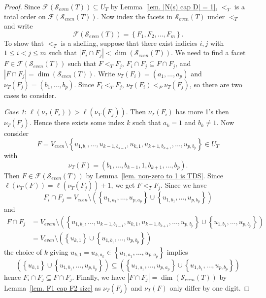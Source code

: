 \documentclass[10pt,a4paper]{amsart}
\newcommand{\calS}{\mathcal{S}}
\newcommand\set[1]{\left\lbrace #1 \right\rbrace}
\begin{document}
\begin{proof}
    Since $\mathcal{F}(\calS_{even}(T)) \subseteq U_T $ by Lemma~\ref{lem. |N(s) cap D| = 1}, $<_T$ is a total order on $\mathcal{F}(\calS_{even}(T))$.
    Now index the facets in $\calS_{even}(T)$ under $<_T$ and write
    $$
    \mathcal{F}(\calS_{even}(T)) = \set{F_1,F_2,\dots,F_m}.
    $$
    To show that $<_T$ is a shelling, suppose that there exist indicies $i,j$ with $1 \leq i < j \leq m$ such that $|F_i \cap F_j| < \dim(\calS_{even}(T))$.
    We need to find a facet $F \in \mathcal{F}(\calS_{even}(T))$ such that $F <_T F_j$, $F_i \cap F_j \subseteq F \cap F_j$, and $|F \cap F_j| = \dim(\calS_{even}(T))$.
    Write $\nu_T(F_i) = (a_1,\dots,a_p)$ and $\nu_T(F_j) = (b_1,\dots,b_p)$.
    Since $F_i <_T F_j$, $\nu_T(F_i) <_P \nu_T(F_j)$, so there are two cases to consider.\newline
    
    \noindent\emph{Case 1}: $\ell(\nu_T(F_i)) > \ell(\nu_T(F_j))$.
    Then $\nu_T(F_i)$ has more 1's then $\nu_T(F_j)$.
    Hence there exists some index $k$ such that $a_k = 1$ and $b_k \neq 1$.
    Now consider 
    $$
    F = V_{even}\setminus \set{u_{1,b_1},\dots,u_{k-1,b_{k-1}}, u_{k,1}, u_{k+1,b_{k+1}},\dots,u_{p,b_p}} \in U_T 
    $$
    with
    $$
    \nu_T(F) = (b_1,\dots,b_{k-1},1,b_{k+1},\dots,b_p).
    $$
    Then $F \in \mathcal{F}(\calS_{even}(T))$ by Lemma~\ref{lem. non-zero to 1 is TDS}.
    Since $\ell(\nu_T(F)) = \ell(\nu_T(F_j)) + 1$, we get $F <_T F_j$.
    Since we have
    $$
    F_i \cap F_j = V_{even} \setminus \left( \set{u_{1,a_1},\dots,u_{p,a_p}} \cup \set{u_{1,b_1},\dots,u_{p,b_p}}\right)
    $$
    and
    \begin{align*}
        F \cap F_j &= V_{evem} \setminus \left(\set{u_{1,b_1},\dots,u_{k-1,b_{k-1}}, u_{k,1}, u_{k+1,b_{k+1}},\dots,u_{p,b_p}} \cup \set{u_{1,b_1},\dots,u_{p,b_p}} \right)\\ 
        &= V_{even} \setminus \left( \set{u_{k,1}}\cup\set{u_{1,b_1},\dots,u_{p,b_p}}\right)
    \end{align*}
    the choice of $k$ giving $u_{k,1} = u_{k,a_k} \in \set{u_{1,a_1},\dots,u_{p,a_p}}$ implies 
    $$
    \left( \set{u_{k,1}}\cup\set{u_{1,b_1},\dots,u_{p,b_p}}\right) \subseteq \left( \set{u_{1,a_1},\dots,u_{p,a_p}} \cup \set{u_{1,b_1},\dots,u_{p,b_p}}\right)
    $$
    hence $F_i \cap F_j \subseteq F \cap F_j$. 
    Finally, we have $|F \cap F_j| = \dim(\calS_{even}(T))$ by Lemma~\ref{lem. F1 cap F2 size} as $\nu_T(F_j)$ and $\nu_T(F)$ only differ by one digit.\newline


\end{proof}
\end{document}
